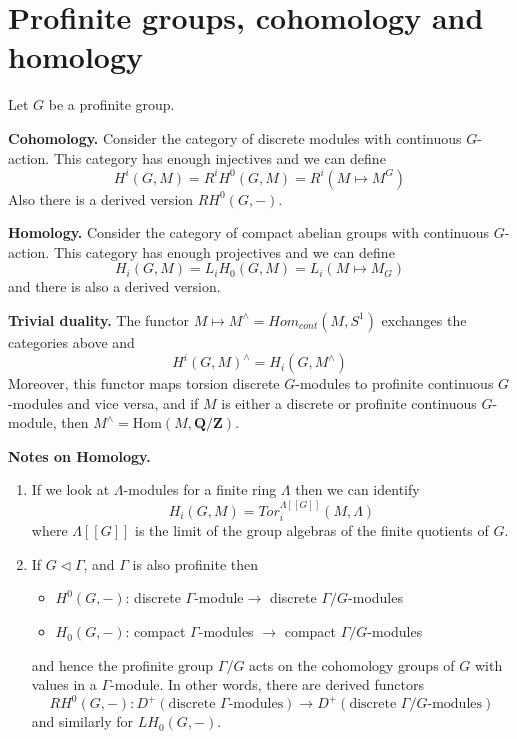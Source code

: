 \section{Profinite groups, cohomology and homology}
\label{section-profinite-cohomology}

\noindent
Let $G$ be a profinite group.

\medskip\noindent
{\bf Cohomology.}
Consider the category of discrete modules with continuous $G$-action.
This category has enough injectives and we can define
$$
H^i(G, M) = R^iH^0(G, M) = R^i(M\mapsto M^G)
$$
Also there is a derived version $RH^0(G, -)$.

\medskip\noindent
{\bf Homology.}
Consider the category of compact abelian groups with continuous $G$-action.
This category has enough projectives and we can define
$$
H_i(G, M) = L_iH_0(G, M)=L_i(M\mapsto M_G)
$$
and there is also a derived version.

\medskip\noindent
{\bf Trivial duality.}
The functor $M\mapsto M^\wedge = Hom_{cont}(M, S^1)$
exchanges the categories above and
$$
H^i(G, M)^\wedge = H_i(G, M^\wedge)
$$
Moreover, this functor maps torsion discrete $G$-modules to profinite
continuous $G$-modules and vice versa, and if $M$ is either a discrete or
profinite continuous $G$-module, then
$M^\wedge = \text{Hom}(M, \mathbf{Q}/\mathbf{Z})$.

\medskip\noindent
{\bf Notes on Homology.}
\begin{enumerate}
\item If we look at $\Lambda$-modules for a finite ring $\Lambda$
then we can identify
$$
H_i(G, M)=Tor_i^{\Lambda[[G]]}(M, \Lambda)
$$
where $\Lambda[[G]]$ is the limit of the group algebras of the finite
quotients of $G$.
\item If $G \vartriangleleft \Gamma$, and $\Gamma$ is also profinite
then
\begin{itemize}
\item $H^0(G, -)$: discrete $\Gamma$-module$\to$ discrete
$\Gamma/G$-modules
\item $H_0(G, -)$: compact $\Gamma$-modules $\to$ compact
$\Gamma/G$-modules
\end{itemize}
and hence the profinite group $\Gamma/G$ acts on the cohomology groups
of $G$ with values in a $\Gamma$-module. In other words, there are derived
functors
$$
RH^0(G, -) :
D^{+}(\text{discrete }\Gamma\text{-modules})
\longrightarrow
D^{+}(\text{discrete }\Gamma/G\text{-modules})
$$
and similarly for $LH_0(G, -)$.
\end{enumerate}








